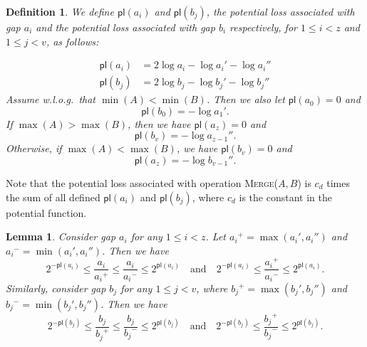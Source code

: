 \documentclass[11pt]{article}
\newcommand{\ens}[1]{\ensuremath{#1}}
\newcommand{\kwUnion}{Merge}
\newcommand{\Unionx}[2]{\mbox{\textsc{\kwUnion(\ensuremath{#1,#2})}}}
\newcommand{\cons}[1]{\ensuremath{c_{#1}}}
\newcommand{\cnsd}{\cons d}
\newcommand{\lasta}{z}
\newcommand{\lastb}{v}
\newcommand{\agap}[1]{\ensuremath{a_{#1}}}
\newcommand{\leftofa}[1]{\ensuremath{a_{#1}'}}
\newcommand{\rightofa}[1]{\ensuremath{a_{#1}''}}
\newcommand{\bgap}[1]{\ensuremath{b_{#1}}}
\newcommand{\leftofb}[1]{\ensuremath{b_{#1}'}}
\newcommand{\rightofb}[1]{\ensuremath{b_{#1}''}}
\newcommand{\maxgap}[1]{\ensuremath{#1^{+}}}
\newcommand{\mingap}[1]{\ensuremath{#1^{-}}}
\newcommand{\potlossa}[1]{\ens{\mathsf{pl}(\agap{#1})}}
\newcommand{\potlossb}[1]{\ens{\mathsf{pl}(\bgap{#1})}}
\newcounter{count}
\newtheorem{lemma}[count]{Lemma}
\newtheorem{defn}[count]{Definition}
\begin{document}
\begin{defn} 
We define \potlossa i and \potlossb j, the potential loss associated with gap \agap i and the potential loss associated with gap \bgap i respectively, for $1\leq i<z$ and $1\leq j<v$, as follows: 


\begin{align} 
\label{eq:potloss} 
\potlossa i &= 2\log\agap i - \log \leftofa i - \log \rightofa i\\ 
\potlossb j &= 2\log\bgap j - \log \leftofb j - \log \rightofb j 
\end{align} 
Assume w.l.o.g.~that $\min(A) < \min(B)$. Then we also let $\potlossa 0 = 0$ and 
\begin{equation} 
\label{eq:potlossboundarybeginning} 
\potlossb 0 = -\log \leftofa 1. 
\end{equation} 
If $\max(A) >\max(B)$, then we have $\potlossa{\lasta} = 0$ and 
\begin{equation} 
\label{eq:potlossboundaryending1} 
\potlossb{\lastb} = -\log \rightofa{\lasta-1}. 
\end{equation} 
Otherwise, if $\max(A) <\max(B)$, we have $\potlossb{\lastb} = 0$ and 
\begin{equation} 
\label{eq:potlossboundaryending2} 
\potlossa{\lasta} = -\log \rightofb{\lastb-1}. 
\end{equation} 

\end{defn} 

Note that the potential loss associated with operation \Unionx{A}{B} is \cnsd{} times the sum of all defined \potlossa i and \potlossb j, where \cnsd{} is the constant in the potential function. 


\begin{lemma} 
\label{lem:gapratio} 
Consider gap \agap i for any $1\leq i< \lasta$. Let $\maxgap{\agap i} = \max(\leftofa i, \rightofa i)$ and $\mingap{\agap i} = \min(\leftofa i, \rightofa i)$. Then we have 
\[ 
2^{-\potlossa i} \leq\frac{\agap i}{\maxgap{\agap i}} \leq \frac{\agap i}{\mingap{\agap i}} \leq 2^{\potlossa i}\quad \text{and} \quad 2^{-\potlossa i} \leq \frac{\maxgap{\agap i}}{\mingap{\agap i}}\leq 2^{\potlossa i}. 
\] 
\noindent Similarly, consider gap \bgap j for any $1\leq j< \lastb$, where $\maxgap{\bgap j} = \max(\leftofb j, \rightofb j)$ and $\mingap{\bgap j} = \min(\leftofb j, \rightofb j)$. Then we have 
\[ 
2^{-\potlossb j} \leq\frac{\bgap j}{\maxgap{\bgap j}} \leq \frac{\bgap j}{\mingap{\bgap j}} \leq 2^{\potlossb j}\quad \text{and} \quad 2^{-\potlossb j} \leq \frac{\maxgap{\bgap j}}{\mingap{\bgap j}}\leq 2^{\potlossb j}. 
\] 
\end{lemma} 
\end{document}
